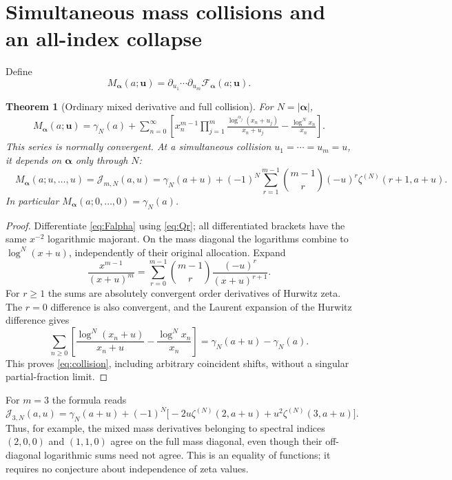 \documentclass[11pt]{article}
\numberwithin{equation}{section}
\newtheorem{theorem}{Theorem}[section]
\theoremstyle{definition}\newtheorem{definition}[theorem]{Definition}
\theoremstyle{remark}\newtheorem{remark}[theorem]{Remark}
\newcommand{\bu}{\boldsymbol{u}}
\newcommand{\ba}{\boldsymbol{\alpha}}
\newcommand{\cF}{\mathcal F}
\newcommand{\cJ}{\mathcal J}
\begin{document}
\section{Simultaneous mass collisions and an all-index collapse}
Define
\begin{equation}\label{eq:mixedderiv}
 M_{\ba}(a;\bu)=\partial_{u_1}\cdots\partial_{u_m}\cF_{\ba}(a;\bu).
\end{equation}
\begin{theorem}[Ordinary mixed derivative and full collision]\label{thm:collision}
For $N=|\ba|$,
\begin{align}\label{eq:ordinarymixed}
 M_{\ba}(a;\bu)=\gamma_N(a)+\sum_{n=0}^{\infty}
 \left[x_n^{m-1}\prod_{j=1}^m
 \frac{\log^{\alpha_j}(x_n+u_j)}{x_n+u_j}
 -\frac{\log^N x_n}{x_n}\right].
\end{align}
This series is normally convergent. At a simultaneous collision $u_1=\cdots=u_m=u$, it depends on $\ba$ only through $N$:
\begin{equation}\label{eq:collision}
 \boxed{\quad
 M_{\ba}(a;u,\ldots,u)=\cJ_{m,N}(a,u)
 =\gamma_N(a+u)+(-1)^N
 \sum_{r=1}^{m-1}\binom{m-1}{r}(-u)^r
 \zeta^{(N)}(r+1,a+u).\quad}
\end{equation}
In particular $M_{\ba}(a;0,\ldots,0)=\gamma_N(a)$.
\end{theorem}
\begin{proof}
Differentiate \eqref{eq:Falpha} using \eqref{eq:Qr}; all differentiated brackets have the same $x^{-2}$ logarithmic majorant. On the mass diagonal the logarithms combine to $\log^N(x+u)$, independently of their original allocation. Expand
\[
 \frac{x^{m-1}}{(x+u)^m}
 =\sum_{r=0}^{m-1}\binom{m-1}{r}\frac{(-u)^r}{(x+u)^{r+1}}.
\]
For $r\ge1$ the sums are absolutely convergent order derivatives of Hurwitz zeta. The $r=0$ difference is also convergent, and the Laurent expansion of the Hurwitz difference gives
\[
 \sum_{n\ge0}\left[\frac{\log^N(x_n+u)}{x_n+u}
                -\frac{\log^N x_n}{x_n}\right]
 =\gamma_N(a+u)-\gamma_N(a).
\]
This proves \eqref{eq:collision}, including arbitrary coincident shifts, without a singular partial-fraction limit.
\end{proof}

For $m=3$ the formula reads
\begin{equation}\label{eq:collision3}
 \cJ_{3,N}(a,u)=\gamma_N(a+u)
 +(-1)^N\bigl[-2u\zeta^{(N)}(2,a+u)+u^2\zeta^{(N)}(3,a+u)\bigr].
\end{equation}
Thus, for example, the mixed mass derivatives belonging to spectral indices $(2,0,0)$ and $(1,1,0)$ agree on the full mass diagonal, even though their off-diagonal logarithmic sums need not agree. This is an equality of functions; it requires no conjecture about independence of zeta values.
\end{document}
